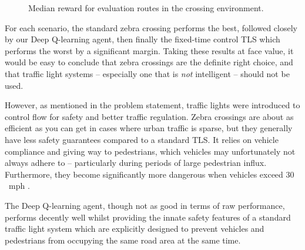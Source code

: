 \documentclass[a4paper]{report}
\begin{document}
\begin{figure}[H]
  \centering
  \caption{Median reward for evaluation routes in the crossing environment.}
  \label{fig:deep_q_learning_crossing_eval}
\end{figure}

For each scenario, the standard zebra crossing performs the best, followed closely by our Deep Q-learning agent, then finally the fixed-time control TLS which performs the worst by a significant margin. Taking these results at face value, it would be easy to conclude that zebra crossings are the definite right choice, and that traffic light systems -- especially one that is \emph{not} intelligent -- should not be used.

However, as mentioned in the problem statement, traffic lights were introduced to control flow for safety and better traffic regulation. Zebra crossings are about as efficient as you can get in cases where urban traffic is sparse, but they generally have less safety guarantees compared to a standard TLS. It relies on vehicle compliance and giving way to pedestrians, which vehicles may unfortunately not always adhere to -- particularly during periods of large pedestrian influx. Furthermore, they become significantly more dangerous when vehicles exceed $30$\ mph \cite{ActiveTravel25}.

The Deep Q-learning agent, though not as good in terms of raw performance, performs decently well whilst providing the innate safety features of a standard traffic light system which are explicitly designed to prevent vehicles and pedestrians from occupying the same road area at the same time.
\end{document}
